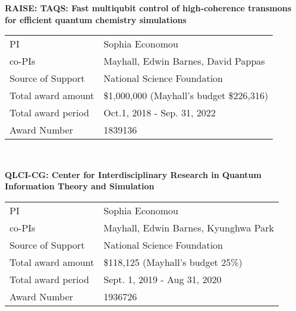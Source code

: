 \documentclass[10pt]{article}
\newenvironment{lonelist}[1][\enskip\textbullet]%
        {\vspace{-\baselineskip}\begin{list}{#1}{%
        \setlength{\partopsep}{0pt}%
        \setlength{\topsep}{0pt}}}
        {\end{list}\vspace{-.6\baselineskip}}
\newcommand{\blankline}{\quad\pagebreak[2]}
\begin{document}
\begin{lonelist}
\item
	{\bf RAISE: TAQS: Fast multiqubit control of high-coherence transmons for efficient quantum chemistry simulations} \\
	\begin{tabular}{l|l}
		PI	& Sophia Economou \\
		co-PIs	& Mayhall, Edwin Barnes, David Pappas \\
		Source of Support & National Science Foundation \\
		Total award amount& \$1,000,000 (Mayhall's budget \$226,316) \\
		Total award period& Oct.1, 2018 - Sep. 31, 2022 \\
		Award Number &1839136
	\end{tabular}\\

\item
	{\bf QLCI-CG: Center for Interdisciplinary Research in Quantum Information Theory and Simulation} \\
	\begin{tabular}{l|l}
		PI	& Sophia Economou \\
		co-PIs	& Mayhall, Edwin Barnes, Kyunghwa Park \\
		Source of Support& National Science Foundation \\
		Total award amount& \$118,125 (Mayhall's budget 25\%)\\
		Total award period& Sept. 1, 2019 - Aug 31, 2020\\
		Award Number& 1936726
	\end{tabular}
\end{lonelist}

\blankline
\end{document}
